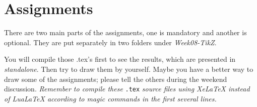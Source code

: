 \documentclass[english]{../TeXTemplate/pkupaper}
\begin{document}
\section{Assignments}
There are two main parts of the assignments, one is mandatory and another is optional.
They are put separately in two folders under \textit{Week08-TikZ}.\par

You will compile those .tex's first to see the results, which are presented in 
\textit{standalone}. Then try to draw them by yourself.
Maybe you have a better way to draw some of the assignments;
please tell the others during the weekend discussion. \emph{Remember to compile these} \verb".tex" \emph{source files using XeLaTeX instead of LuaLaTeX according to magic commands in the first several lines.}
\end{document}
